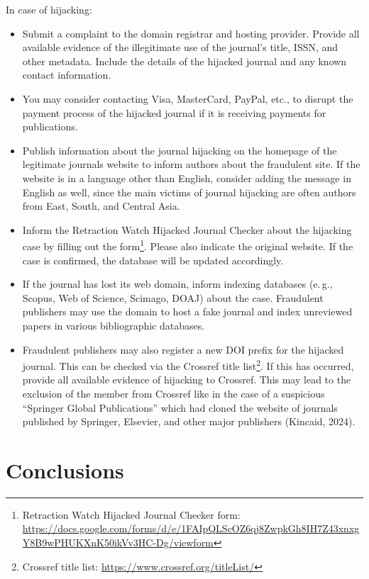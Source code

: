 \documentclass[a4paper,
fontsize=11pt,
oneside,
numbers=noperiodatend,
parskip=half-,
bibliography=totoc,
final
]{scrartcl}
\begin{document}
In case of hijacking:

\begin{itemize}
\item
  Submit a complaint to the domain registrar and hosting provider.
  Provide all available evidence of the illegitimate use of the
  journal's title, ISSN, and other metadata. Include the details of the
  hijacked journal and any known contact information.
\item
  You may consider contacting Visa, MasterCard, PayPal, etc., to disrupt
  the payment process of the hijacked journal if it is receiving
  payments for publications.
\item
  Publish information about the journal hijacking on the homepage of the
  legitimate journal\textquotesingle s website to inform authors about
  the fraudulent site. If the website is in a language other than
  English, consider adding the message in English as well, since the
  main victims of journal hijacking are often authors from East, South,
  and Central Asia.
\item
  Inform the Retraction Watch Hijacked Journal Checker about the
  hijacking case by filling out the form\footnote{Retraction Watch
    Hijacked Journal Checker form:
    \url{https://docs.google.com/forms/d/e/1FAIpQLScOZ6qj8ZwpkGh8IH7Z43xnxgY8B9wPHUKXnK50ikVv3HC-Dg/viewform}}.
  Please also indicate the original website. If the case is confirmed,
  the database will be updated accordingly.
\item
  If the journal has lost its web domain, inform indexing databases (e.\,g., Scopus, Web of Science, Scimago, DOAJ) about the case. Fraudulent
  publishers may use the domain to host a fake journal and index
  unreviewed papers in various bibliographic databases.
\item
  Fraudulent publishers may also register a new DOI prefix for the
  hijacked journal. This can be checked via the Crossref title
  list\footnote{Crossref title list:
    \url{https://www.crossref.org/titleList/}}. If this has occurred,
  provide all available evidence of hijacking to Crossref. This may lead
  to the exclusion of the member from Crossref like in the case of a
  suspicious \enquote{Springer Global Publications} which had cloned the
  website of journals published by Springer, Elsevier, and other major
  publishers (Kincaid, 2024).
\end{itemize}

\section{Conclusions}\label{conclusions}
\end{document}
